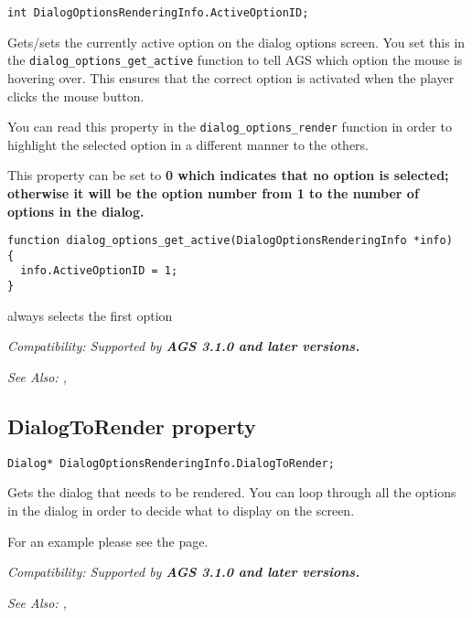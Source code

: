 \begin{verbatim}
int DialogOptionsRenderingInfo.ActiveOptionID;
\end{verbatim}
Gets/sets the currently active option on the dialog options screen. You set this in the
\verb$dialog_options_get_active$ function to tell AGS which option the mouse is hovering over.
This ensures that the correct option is activated when the player clicks the mouse button.

You can read this property in the \verb$dialog_options_render$ function in order to highlight
the selected option in a different manner to the others.

This property can be set to \bf{0} which indicates that no option is selected; otherwise it
will be the option number from 1 to the number of options in the dialog.

\begin{verbatim}
function dialog_options_get_active(DialogOptionsRenderingInfo *info)
{
  info.ActiveOptionID = 1;
}
\end{verbatim}
always selects the first option

\it{Compatibility:} Supported by \bf{AGS 3.1.0} and later versions.

\it{See Also:} ,


\subsection{DialogToRender property}\label{DialogOptionsRenderingInfo.DialogToRender}%

\begin{verbatim}
Dialog* DialogOptionsRenderingInfo.DialogToRender;
\end{verbatim}
Gets the dialog that needs to be rendered. You can loop through all the options in the dialog
in order to decide what to display on the screen.

For an example please see the  page.

\it{Compatibility:} Supported by \bf{AGS 3.1.0} and later versions.

\it{See Also:} ,

